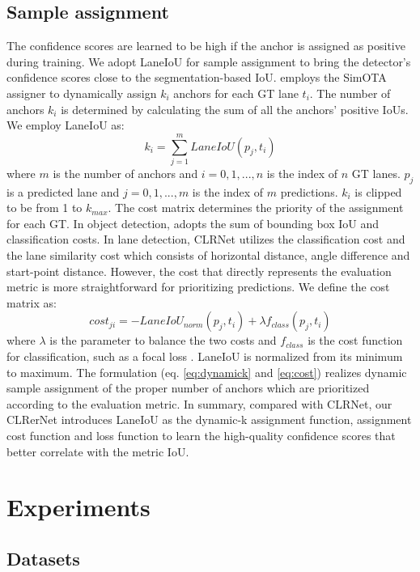 \documentclass[10pt,twocolumn,letterpaper]{article}
\begin{document}
\subsection{Sample assignment}
The confidence scores are learned to be high if the anchor is assigned as positive during training. We adopt LaneIoU for sample assignment to bring the detector's confidence scores close to the segmentation-based IoU.
\cite{Zheng_2022_CVPR} employs the SimOTA assigner \cite{YOLOX} to dynamically assign $k_i$ anchors for each GT lane $t_i$. The number of anchors $k_i$ is determined by calculating the sum of all the anchors' positive IoUs. We employ LaneIoU as:
\begin{equation}
\label{eq:dynamick}
k_i=\sum_{j=1}^mLaneIoU(p_j, t_i)
\end{equation}
where $m$ is the number of anchors and $i=0, 1, ..., n$ is the index of $n$ GT lanes. $p_j$ is a predicted lane and $j=0, 1, ..., m$ is the index of $m$ predictions.
$k_i$ is clipped to be from 1 to $k_{max}$.
The cost matrix determines the priority of the assignment for each GT.
In object detection, \cite{YOLOX} adopts the sum of bounding box IoU and classification costs.
In lane detection, CLRNet \cite{Zheng_2022_CVPR} utilizes the classification cost and the lane similarity cost which consists of horizontal distance, angle difference and start-point distance.
However, the cost that directly represents the evaluation metric is more straightforward for prioritizing predictions.
We define the cost matrix as:
\begin{equation}
\label{eq:cost}
cost_{ji}=-LaneIoU_{norm}(p_j, t_i)+\lambda f_{class}(p_j, t_i)
\end{equation}
where $\lambda$ is the parameter to balance the two costs and $f_{class}$ is the cost function for classification, such as a focal loss \cite{focalloss}. LaneIoU is normalized from its minimum to maximum.
The formulation (eq. \ref{eq:dynamick} and \ref{eq:cost}) realizes dynamic sample assignment of the proper number of anchors which are prioritized according to the evaluation metric. 
In summary, compared with CLRNet, our CLRerNet introduces LaneIoU as the dynamic-k assignment function, assignment cost function and loss function to learn the high-quality confidence scores that better correlate with the metric IoU.

\section{Experiments}
\subsection{Datasets}\label{subsec:datasets}
\end{document}
